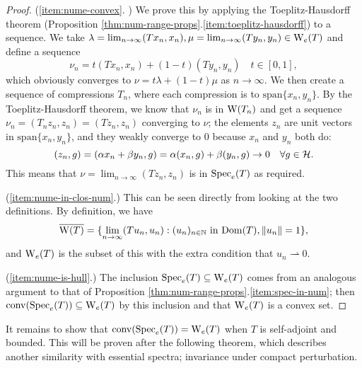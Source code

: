 \documentclass[../main.tex]{subfiles}
\begin{document}
\begin{proof}
(\ref{item:nume-convex}. \cite{bogli2020essential}) We prove this by applying
the Toeplitz-Hausdorff theorem (Proposition
\ref{thm:num-range-props}.\ref{item:toeplitz-hausdorff}) to a sequence.
We take $\lambda = \lim_{n \rightarrow \infty}(Tx_n, x_n), \mu = \lim_{n
\rightarrow \infty}(Ty_n, y_n) \in \mathrm{W}_e(T)$ and define a sequence
$$\nu_n = t(Tx_n, x_n) + (1-t)(Ty_n, y_n) \quad t \in [0, 1],$$ which
obviously converges to $\nu = t\lambda + (1-t)\mu$ as 
$n \rightarrow \infty$.
We then create a sequence of compressions $T_n$, where each compression is to
$\text{span}\{x_n, y_n\}$. By the Toeplitz-Hausdorff theorem, we know
that $\nu_n$ is in $\mathrm{W}(T_n)$ and get a sequence $\nu_n = (T_n z_n, z_n) = (Tz_n, z_n)$
converging to $\nu$; the elements $z_n$ are unit vectors in
$\text{span}\{x_n, y_n\}$, and they weakly converge to 0 because $x_n$
and $y_n$ both do:
$$(z_n, g) = (\alpha x_n + \beta y_n, g) = \alpha(x_n, g) + \beta(y_n, g) \rightarrow 0 \quad \forall g \in \mathcal{H}.$$
This means that $\nu = \lim_{n \rightarrow \infty}(Tz_n, z_n)$ is in $\mathrm{Spec}_e(T)$ as required.

(\ref{item:nume-in-clos-num}.) This can be seen directly from looking at the two
definitions. By definition, we have
  $$\overline{\mathrm{W}(T)} = \{\lim_{n \rightarrow \infty}( Tu_n, u_n ) 
			   : (u_n)_{n \in \mathbb{N}}\text{ in } \mathrm{Dom}(T),
			   \|u_n\|=1\},$$
and $\mathrm{W}_e(T)$ is the subset of this with the extra condition
that $u_n \rightharpoonup 0$.

(\ref{item:nume-is-hull}.) The inclusion $\mathrm{Spec}_e(T) \subseteq \mathrm{W}_e(T)$ comes
from an analogous argument to that of Proposition
\ref{thm:num-range-props}.\ref{item:spec-in-num}; then
$\mathrm{conv}(\mathrm{Spec}_e(T)) \subseteq \mathrm{W}_e(T)$
by this inclusion and that $\mathrm{W}_e(T)$ is a convex set.
\end{proof}
It remains to show that $\mathrm{conv}(\mathrm{Spec}_e(T)) = \mathrm{W}_e(T)$ when $T$ is self-adjoint
and bounded. This will be proven after the following theorem, which describes
another similarity with essential spectra; invariance under compact
perturbation.
\end{document}
